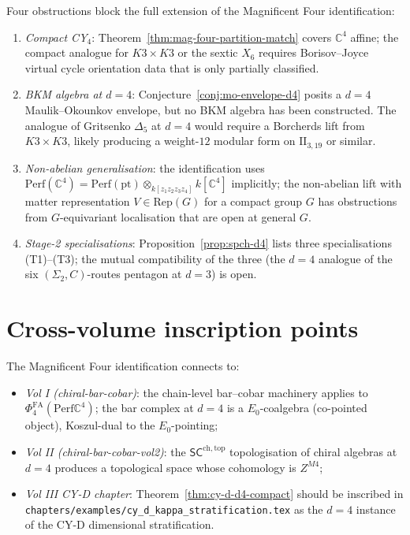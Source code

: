 \documentclass[11pt]{article}
\providecommand{\C}{\mathbb{C}}
\providecommand{\Perf}{\mathrm{Perf}}
\providecommand{\Rep}{\mathrm{Rep}}
\providecommand{\PhiFA}{\Phi^{\mathrm{FA}}}
\theoremstyle{definition}
\begin{document}
Four obstructions block the full extension of the Magnificent Four
identification:
\begin{enumerate}[label=(O\arabic*)]
  \item \emph{Compact CY$_4$}: Theorem~\ref{thm:mag-four-partition-match}
  covers $\C^4$ affine; the compact analogue for $K3 \times K3$ or
  the sextic $X_6$ requires Borisov--Joyce virtual cycle orientation
  data that is only partially classified.
  \item \emph{BKM algebra at $d = 4$}: Conjecture~\ref{conj:mo-envelope-d4}
  posits a $d = 4$ Maulik--Okounkov envelope, but no BKM algebra has
  been constructed. The analogue of Gritsenko $\Delta_5$ at $d = 4$
  would require a Borcherds lift from $K3 \times K3$, likely producing a
  weight-$12$ modular form on $\mathrm{II}_{3, 19}$ or similar.
  \item \emph{Non-abelian generalisation}: the identification uses
  $\Perf(\C^4) = \Perf(\mathrm{pt}) \otimes_{k[z_1 z_2 z_3 z_4]} k[\C^4]$
  implicitly; the non-abelian lift with matter representation
  $V \in \Rep(G)$ for a compact group $G$ has obstructions from
  $G$-equivariant localisation that are open at general $G$.
  \item \emph{Stage-2 specialisations}: Proposition~\ref{prop:spch-d4}
  lists three specialisations (T1)--(T3); the mutual compatibility
  of the three (the $d = 4$ analogue of the six $(\Sigma_2, C)$-routes
  pentagon at $d = 3$) is open.
\end{enumerate}

\section{Cross-volume inscription points}
\label{sec:cross-vol-inscribe}

The Magnificent Four identification connects to:
\begin{itemize}[leftmargin=2em]
  \item \emph{Vol I (chiral-bar-cobar)}: the chain-level bar--cobar
  machinery applies to $\PhiFA_4(\Perf \C^4)$; the bar complex at
  $d = 4$ is a $E_0$-coalgebra (co-pointed object), Koszul-dual to the
  $E_0$-pointing;
  \item \emph{Vol II (chiral-bar-cobar-vol2)}: the $\mathsf{SC}^{\mathrm{ch,top}}$
  topologisation of chiral algebras at $d = 4$ produces a topological
  space whose cohomology is $Z^{M4}$;
  \item \emph{Vol III CY-D chapter}:
  Theorem~\ref{thm:cy-d-d4-compact} should be inscribed in
  \texttt{chapters/examples/cy\_d\_kappa\_stratification.tex} as the
  $d = 4$ instance of the CY-D dimensional stratification.
\end{itemize}
\end{document}
